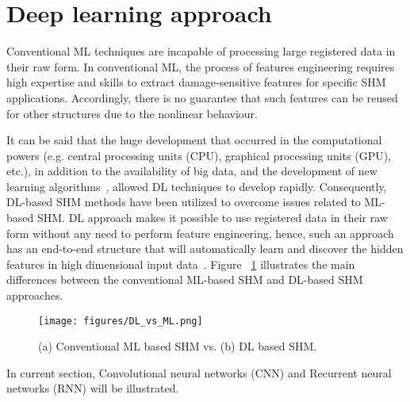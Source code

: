 \section{Deep learning approach}
Conventional ML techniques are incapable of processing large registered data in their raw form.
In conventional ML, the process of features engineering requires high expertise and skills to extract damage-sensitive features for specific SHM applications.
Accordingly, there is no guarantee that such features can be reused for other structures due to the nonlinear behaviour. 

It can be said that the huge development that occurred in the computational powers (e.g. central processing units (CPU), graphical processing units (GPU), etc.), in addition to the availability of big data, and the development of new learning algorithms~\cite{Yuan2020},  allowed DL techniques to develop rapidly.
Consequently, DL-based SHM methods have been utilized to overcome issues related to ML-based SHM.  
DL approach makes it possible to use registered data in their raw form without any need to perform feature engineering, hence, such an approach has an end-to-end structure that will automatically learn and discover the hidden features in high dimensional input data~\cite{LeCun, Networks}. 
Figure ~\ref{fig:DL_ML} illustrates the main differences between the conventional ML-based SHM and DL-based SHM approaches.

\begin{figure}[!h]
	\begin{center}
		\texttt{[image: figures/DL\_vs\_ML.png]}
	\end{center}
	\caption{(a) Conventional ML based SHM vs. (b) DL based SHM.}
	\label{fig:DL_ML}
\end{figure} 

In current section, Convolutional neural networks (CNN) and Recurrent neural networks (RNN) will be illustrated.

